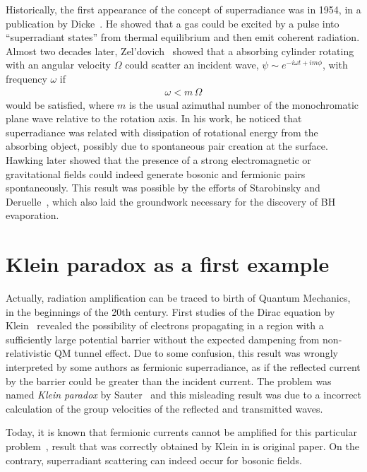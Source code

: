 Historically, the first appearance of the concept of superradiance was in 1954, in a publication by Dicke~\cite{Dicke1954}.
He showed that a gas could be excited by a pulse into ``superradiant states'' from thermal equilibrium and then emit coherent radiation.
Almost two decades later, Zel'dovich~\cite{Zeldovich1971,Zeldovich1972} showed that a absorbing cylinder rotating with an angular velocity $\Omega$ could scatter an incident wave, $\psi \sim e^{-i \omega t + i m \phi}$, with frequency $\omega$ if
\begin{align}
    \omega < m\, \Omega
    \label{eq1:superradiance}
\end{align}
would be satisfied, where $m$ is the usual azimuthal number of the monochromatic plane wave relative to the rotation axis.
In his work, he noticed that superradiance was related with dissipation of rotational energy from the absorbing object, possibly due to spontaneous pair creation at the surface. 
Hawking later showed that the presence of a strong electromagnetic or gravitational fields could indeed generate bosonic and fermionic pairs spontaneously.
This result was possible by the efforts of Starobinsky and Deruelle~\cite{Starobinsky1973a,Starobinsky1973b,Deruelle1974,Deruelle1975}, which also laid the groundwork necessary for the discovery of BH evaporation.


\section{Klein paradox as a first example}

Actually, radiation amplification can be traced to birth of Quantum Mechanics, in the beginnings of the 20th century. 
First studies of the Dirac equation by Klein~\cite{Klein1929} revealed the possibility of electrons propagating in a region with a sufficiently large potential barrier without the expected dampening from non-relativistic QM tunnel effect.
Due to some confusion, this result was wrongly interpreted by some authors as fermionic superradiance, as if the reflected current by the barrier could be greater than the incident current. 
The problem was named \emph{Klein paradox} by Sauter~\cite{Sauter1931} and this misleading result was due to a incorrect calculation of the group velocities of the reflected and transmitted waves. 

Today, it is known that fermionic currents cannot be amplified for this particular problem~\cite{Manogue1988,Klein1929}, result that was correctly obtained by Klein in is original paper. 
On the contrary, superradiant scattering can indeed occur for bosonic fields.

